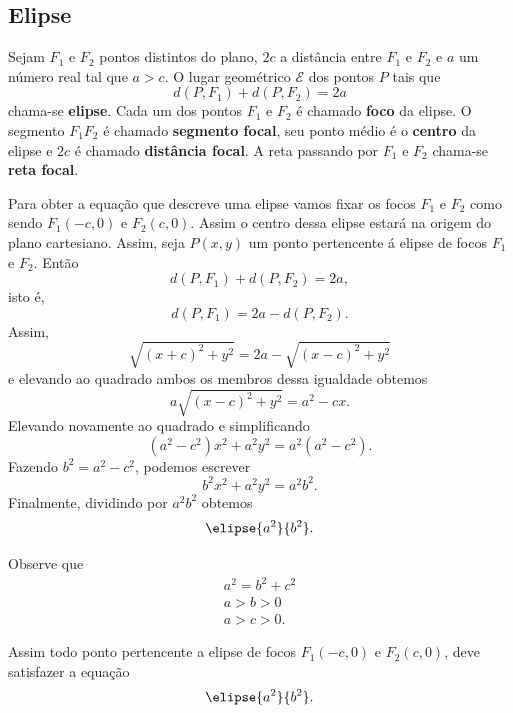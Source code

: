 \subsection{Elipse} %
\label{sub:elipse}

\begin{definicao}
  Sejam $F_1$ e $F_2$ pontos distintos do plano, $2c$ a distância entre $F_1$ e $F_2$ e $a$ um n\'umero real tal que $a > c$. O lugar geométrico $\mathcal{E}$ dos pontos $P$ tais que
  \begin{equation}\label{definicaoelipse}
    d(P,F_1) + d(P,F_2) = 2a
  \end{equation}
  chama-se \textbf{elipse}. Cada um dos pontos $F_1$ e $F_2$ é chamado \textbf{foco} da elipse. O segmento $F_1F_2$ é chamado \textbf{segmento focal}, seu ponto médio é o \textbf{centro} da elipse e $2c$ é chamado \textbf{distância focal}. A reta passando por $F_1$ e $F_2$ chama-se \textbf{reta focal}.   
\end{definicao}

Para obter a equação que descreve uma elipse vamos fixar os focos $F_1$ e $F_2$ como sendo $F_1(-c,0)$ e $F_2(c,0)$. Assim o centro dessa elipse estar\'a na origem do plano cartesiano. Assim, seja $P(x,y)$ um ponto pertencente á elipse de focos $F_1$ e $F_2$. Então
\begin{equation}
  d(P,F_1) + d(P,F_2) = 2a,
\end{equation}
isto é,
\begin{equation}
  d(P,F_1) = 2a -  d(P,F_2).
\end{equation}
Assim,
\[
  \sqrt{(x + c)^2 + y^2} = 2a - \sqrt{(x - c)^2 + y^2}
\]
e elevando ao quadrado ambos os membros dessa igualdade obtemos
\[
  a\sqrt{(x - c)^2 + y^2} = a^2 - cx.
\]
Elevando novamente ao quadrado e simplificando
\[
  (a^2 - c^2)x^2 + a^2y^2 = a^2(a^2 - c^2).
\]
Fazendo $b^2 = a^2 - c^2$, podemos escrever
\[
  b^2x^2 + a^2y^2 = a^2b^2.
\]
Finalmente, dividindo por $a^2b^2$ obtemos
\begin{equation}\label{equacaoelipse}
  \elipse{a^2}{b^2}.
\end{equation}

Observe que
\begin{align}
  a^2 = b^2 + c^2\\
  a > b > 0\\
  a > c > 0.
\end{align}

Assim todo ponto pertencente a elipse de focos $F_1(-c,0)$ e $F_2(c,0)$, deve satisfazer a equação
\[
  \elipse{a^2}{b^2}.
\]

